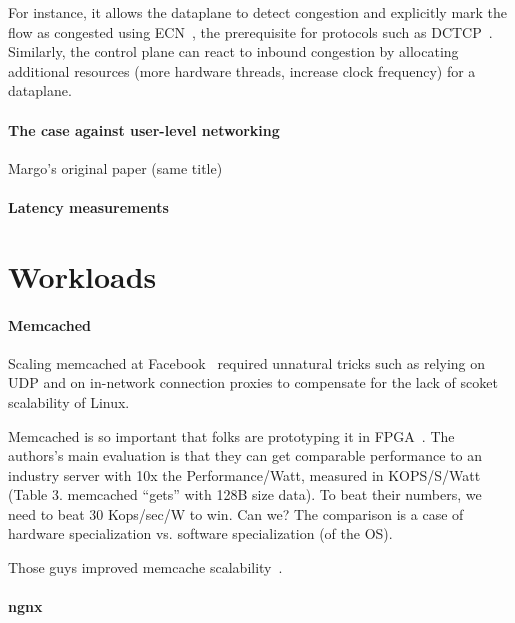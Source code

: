 For instance, it allows the dataplane to detect
congestion and explicitly mark the flow as congested using
ECN~\cite{ramakrishnan2001addition}, the prerequisite for protocols
such as DCTCP~\cite{DBLP:conf/sigcomm/AlizadehGMPPPSS10}. Similarly,
the control plane can react to inbound congestion by allocating
additional resources (more hardware threads, increase clock frequency)
for a dataplane.




\paragraph{The case against user-level networking}
Margo's original paper (same title)~\cite{magoutis2004case}

\paragraph*{Latency measurements}  

\section{Workloads}

\paragraph*{Memcached} 
Scaling memcached at Facebook~\cite{nishtala2013scaling} required
unnatural tricks such as relying on UDP and on in-network connection
proxies to compensate for the lack of scoket scalability of Linux.

Memcached is so important that folks are prototyping it in
FPGA~\cite{DBLP:conf/fpga/ChalamalasettiLWARM13}.  The authors's main evaluation is
that they can get comparable performance to an industry server with
10x the Performance/Watt, measured in KOPS/S/Watt (Table 3. memcached
``gets'' with 128B size data). To beat their numbers, we need to beat
30 Kops/sec/W to win.  Can we?  The comparison is a case of hardware
specialization vs. software specialization (of the OS).

Those guys improved memcache scalability~\cite{fan2013memc3}.



\paragraph*{ngnx}


